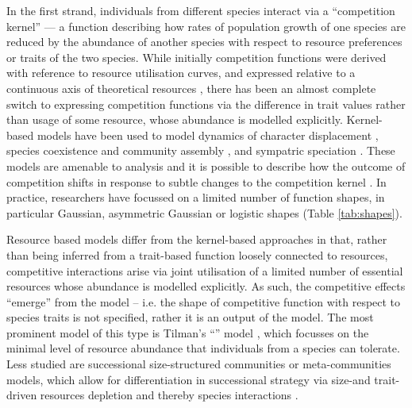 \documentclass[a4paper,11pt]{article}
\begin{document}
In the first strand, individuals from different species interact via a
``competition kernel'' --- a function describing how rates of
population growth of one species are reduced by the abundance of
another species with respect to resource preferences or traits of the
two species.
%
While initially competition functions were derived with reference to resource
utilisation curves, and expressed relative to a continuous axis of theoretical resources
\citep{MacArthur-1967, Roughgarden-1979}, there has been an almost
complete switch to expressing competition functions via the
difference in trait values rather than usage of some resource, whose
abundance is modelled explicitly.
%
Kernel-based models have been used to model dynamics of
character displacement \citep{Taper-1985, Case-2000}, species
coexistence and community assembly \citep{MacArthur-1967,
  Calcagno-2006, Leimar-2013}, and sympatric speciation
\citep{Dieckmann-1999}.
%
These models are amenable to analysis and it is possible to describe how
the outcome of competition shifts in response to subtle changes to the competition
kernel \citep{Calcagno-2006, Scheffer-2006, Pigolotti-2007,
  Leimar-2013}.
%
In practice, researchers have focussed on a limited number of function
shapes, in particular Gaussian, asymmetric Gaussian or logistic shapes
(Table \ref{tab:shapes}).

Resource based models differ from the kernel-based approaches in that,
rather than being inferred from a trait-based function loosely connected to resources, competitive
interactions arise via joint utilisation of
a limited number of essential resources whose abundance is modelled
explicitly.  As such, the competitive effects ``emerge'' from the
model -- i.e. the shape of competitive function with respect to
species traits is not specified, rather it is an output of the model.
%
The most prominent model of this type is Tilman's ``\Rstar'' model \citep{Tilman-1977,
  Tilman-1982}, which focusses on the minimal level of resource
abundance that individuals from a species can tolerate.
Less studied are successional size-structured communities or
meta-communities models, which allow for
differentiation in successional strategy via size-and
trait-driven resources depletion and thereby species interactions
\citep{Huston-1987,Kohyama-1993,Moorcroft-2001,Falster-2011}.
\end{document}

